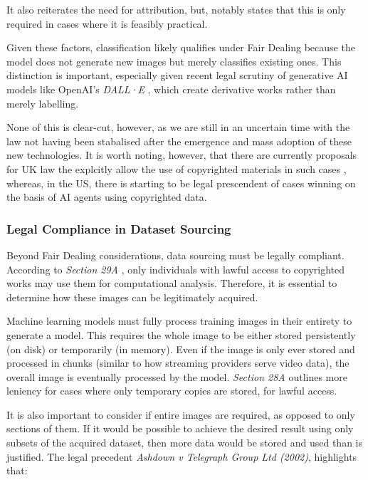                   It also reiterates the need for attribution, but, notably states that this is only required in cases where it is feasibly practical.
    
                  Given these factors, classification likely qualifies under Fair Dealing because the model does not generate new images but merely classifies existing ones. This distinction is important, especially given recent legal scrutiny of generative AI models like OpenAI’s \textit{DALL·E} \cite{times2025christies_ai_auction}\cite{guardian2025ai_art_auction}, which create derivative works rather than merely labelling.
    
                  None of this is clear-cut, however, as we are still in an uncertain time with the law not having been stabalised after the emergence and mass adoption \cite{bick2024rapid} of these new technologies. It is worth noting, however, that there are currently proposals for UK law the explcitly allow the use of copyrighted materials in such cases \cite{guardian2024uk_ai_copyright}, whereas, in the US, there is starting to be legal prescendent of cases winning on the basis \cite{apnews2025thomson_reuters_ai_case} of AI agents using copyrighted data.
    
              \subsubsection{Legal Compliance in Dataset Sourcing}
    
                  Beyond Fair Dealing considerations, data sourcing must be legally compliant. According to \textit{Section 29A} \cite{cdpa1988}, only individuals with lawful access to copyrighted works may use them for computational analysis. Therefore, it is essential to determine how these images can be legitimately acquired.
    
                  Machine learning models must fully process training images in their entirety to generate a model. This requires the whole image to be either stored persistently (on disk) or temporarily (in memory). Even if the image is only ever stored and processed in chunks (similar to how streaming providers serve video data), the overall image is eventually processed by the model. \textit{Section 28A} outlines more leniency for cases where only temporary copies are stored, for lawful access.
    
                  It is also important to consider if entire images are required, as opposed to only sections of them. If it would be possible to achieve the desired result using only subsets of the acquired dataset, then more data would be stored and used than is justified. The legal precedent \textit{Ashdown v Telegraph Group Ltd (2002)}, highlights that:
    
